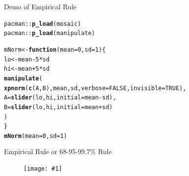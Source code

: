 \documentclass{beamer}\usepackage[]{graphicx}\usepackage[]{color}
\newcommand{\hlnum}[1]{\textcolor[rgb]{0.686,0.059,0.569}{#1}}%
\newcommand{\hlopt}[1]{\textcolor[rgb]{0,0,0}{#1}}%
\newcommand{\hlstd}[1]{\textcolor[rgb]{0.345,0.345,0.345}{#1}}%
\newcommand{\hlkwa}[1]{\textcolor[rgb]{0.161,0.373,0.58}{\textbf{#1}}}%
\newcommand{\hlkwb}[1]{\textcolor[rgb]{0.69,0.353,0.396}{#1}}%
\newcommand{\hlkwc}[1]{\textcolor[rgb]{0.333,0.667,0.333}{#1}}%
\newcommand{\hlkwd}[1]{\textcolor[rgb]{0.737,0.353,0.396}{\textbf{#1}}}%
\newenvironment{knitrout}{}{} %
\newcommand {\framedgraphic}[1] {
	\begin{figure}
		\centering
		\texttt{[image: \#1]}
	\end{figure}
}
\begin{document}
\begin{frame}[fragile]{Demo of Empirical Rule}

\begin{knitrout}\scriptsize
{}\color{fgcolor}
\begin{alltt}
\hlstd{pacman}\hlopt{::}\hlkwd{p_load}\hlstd{(mosaic)}
\hlstd{pacman}\hlopt{::}\hlkwd{p_load}\hlstd{(manipulate)}

\hlstd{mNorm} \hlkwb{<-} \hlkwa{function}\hlstd{(}\hlkwc{mean} \hlstd{=} \hlnum{0}\hlstd{,} \hlkwc{sd} \hlstd{=} \hlnum{1}\hlstd{) \{}
  \hlstd{lo} \hlkwb{<-} \hlstd{mean} \hlopt{-} \hlnum{5} \hlopt{*} \hlstd{sd}
  \hlstd{hi} \hlkwb{<-} \hlstd{mean} \hlopt{+} \hlnum{5} \hlopt{*} \hlstd{sd}
  \hlkwd{manipulate}\hlstd{(}
        \hlkwd{xpnorm}\hlstd{(}\hlkwd{c}\hlstd{(A,B), mean, sd,} \hlkwc{verbose} \hlstd{=} \hlnum{FALSE}\hlstd{,} \hlkwc{invisible} \hlstd{=} \hlnum{TRUE}\hlstd{),}
        \hlkwc{A} \hlstd{=} \hlkwd{slider}\hlstd{(lo, hi,} \hlkwc{initial} \hlstd{= mean} \hlopt{-} \hlstd{sd),}
        \hlkwc{B} \hlstd{=} \hlkwd{slider}\hlstd{(lo, hi,} \hlkwc{initial} \hlstd{= mean} \hlopt{+} \hlstd{sd)}
 \hlstd{)}
\hlstd{\}}
\hlkwd{mNorm}\hlstd{(}\hlkwc{mean} \hlstd{=} \hlnum{0}\hlstd{,} \hlkwc{sd} \hlstd{=} \hlnum{1}\hlstd{)}
\end{alltt}

\end{knitrout}
\end{frame}


\begin{frame}[fragile]{Empirical Rule or 68-95-99.7\% Rule}

\framedgraphic{6899rule.png}

\end{frame}
\end{document}
